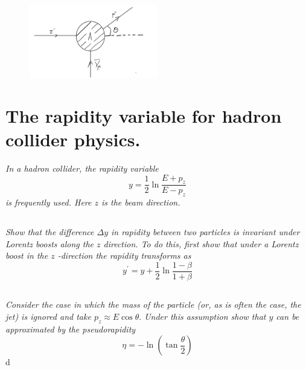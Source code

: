 \documentclass{article}
\begin{document}
\begin{figure}[h!]
    \centering
    \includegraphics[width=0.5\textwidth]{figures/problem_9.png}
    \label{fig:my_label}
\end{figure}



\newpage


\section{The rapidity variable for hadron collider physics.}
\textit{In a hadron collider, the rapidity variable
$$
y=\frac{1}{2} \ln \frac{E+p_{z}}{E-p_{z}}
$$
is frequently used. Here $z$ is the beam direction.}


\subsection{}
\textit{Show that the difference $\Delta y$ in rapidity between two particles is invariant under Lorentz boosts along the $z$ direction. To do this, first show that under a Lorentz boost in the $z$ -direction the rapidity transforms as
$$
y^{\prime}=y+\frac{1}{2} \ln \frac{1-\beta}{1+\beta}
$$}


\subsection{}
\textit{Consider the case in which the mass of the particle (or, as is often the case, the jet) is ignored and take $p_{z} \approx E \cos \theta .$ Under this assumption show that $y$ can be approximated by the pseudorapidity
$$
\eta=-\ln \left(\tan \frac{\theta}{2}\right)
$$}d
\end{document}

